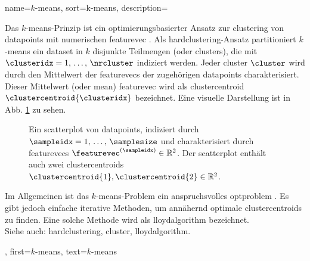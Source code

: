 {{{{
{
    name={$k$-means}, 
    sort={k-means},
    description={Das $k$-means-Prinzip ist ein optimierungsbasierter Ansatz zur \gls{clustering} von \glspl{datapoint} mit numerischen \gls{featurevec} \cite[Ch. 8]{MLBasics}. 
    Als \gls{hardclustering}-Ansatz partitioniert $k$-means ein \gls{dataset} in $k$ disjunkte Teilmengen (oder \glspl{cluster}), die mit $\clusteridx=1,\,\ldots,\,\nrcluster$ indiziert werden. Jeder \gls{cluster} $\cluster$ wird durch den Mittelwert der \glspl{featurevec} der zugehörigen \glspl{datapoint} charakterisiert. Dieser Mittelwert (oder \gls{mean}) \gls{featurevec} wird als \gls{clustercentroid} $\clustercentroid{\clusteridx}$ bezeichnet. 
    Eine visuelle Darstellung ist in Abb. \ref{fig_kmeans_dict} zu sehen.
    \begin{figure}[H]
    \begin{center}
    \end{center}
    \caption{Ein \gls{scatterplot} von \glspl{datapoint}, indiziert durch $\sampleidx=1,\,\ldots,\,\samplesize$ und charakterisiert durch \glspl{featurevec} $\featurevec^{(\sampleidx)} \in \mathbb{R}^{2}$. 
    Der \gls{scatterplot} enthält auch zwei \glspl{clustercentroid} $\clustercentroid{1}, \clustercentroid{2} \in \mathbb{R}^{2}$. \label{fig_kmeans_dict}}
    \end{figure} 
    Im Allgemeinen ist das $k$-means-Problem ein anspruchsvolles \gls{optproblem} \cite{Mahajan2009Springer}. 
    Es gibt jedoch einfache iterative Methoden, um annähernd optimale \glspl{clustercentroid} zu finden. Eine solche Methode wird als \gls{lloydalgorithm} bezeichnet.\\
    Siehe auch: \gls{hardclustering}, \gls{cluster}, \gls{lloydalgorithm}.},
    first={$k$-means},
    text={$k$-means} 
}

}}}}
